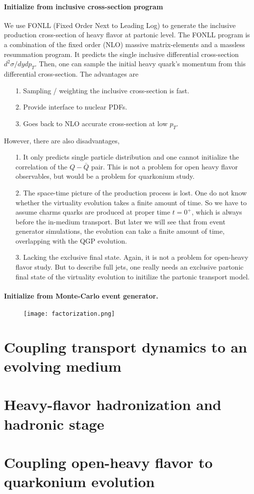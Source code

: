 \paragraph{Initialize from inclusive cross-section program}
We use FONLL (Fixed Order Next to Leading Log) to generate the inclusive production cross-section of heavy flavor at partonic level.
The FONLL program is a combination of the fixed order (NLO) massive matrix-elements and a massless resummation program.
It predicts the single inclusive differential cross-section $d^2\sigma/dydp_T$. 
Then, one can sample the initial heavy quark's momentum from this differential cross-section.
The advantages are
\begin{itemize}
\item[1.] Sampling / weighting the inclusive cross-section is fast.
\item[2.] Provide interface to nuclear PDFs.
\item[3.] Goes back to NLO accurate cross-section at low $p_T$.
\end{itemize} 
However, there are also disadvantages, 
\begin{itemize}
\item[1.] It only predicts single particle distribution and one cannot initialize the correlation of the $Q-\bar{Q}$ pair. This is not a problem for open heavy flavor observables, but would be a problem for quarkonium study.
\item[2.] The space-time picture of the production process is lost. One do not know whether the virtuality evolution takes a finite amount of time. So we have to assume charms quarks are produced at proper time $t=0^{+}$, which is always before the in-medium transport. But later we will see that from event generator simulations, the evolution can take a finite amount of time, overlapping with the QGP evolution.
\item[3.] Lacking the exclusive final state. Again, it is not a problem for open-heavy flavor study. But to describe full jets, one really needs an exclusive partonic final state of the virtuality evolution to initilize the partonic transport model.
\end{itemize}


\paragraph{Initialize from Monte-Carlo event generator.}

\begin{figure}
\centering
\texttt{[image: factorization.png]}
\caption{
}
\label{fig:factorization}
\end{figure}


\section{Coupling transport dynamics to an evolving medium}

\section{Heavy-flavor hadronization and hadronic stage}

\section{Coupling open-heavy flavor to quarkonium evolution}
